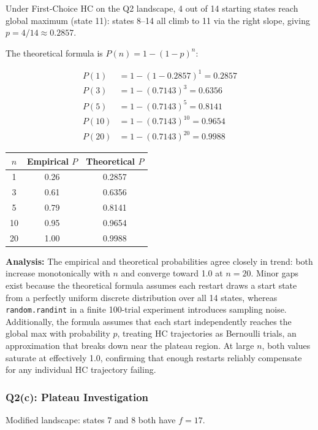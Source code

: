 \documentclass[12pt,a4paper]{article}
\begin{document}
Under First-Choice HC on the Q2 landscape, 4 out of 14 starting states reach
 global maximum (state 11): states 8--14 all climb to 11 via the right slope,
giving $p = 4/14 \approx 0.2857$.

The theoretical formula is $P(n) = 1 - (1-p)^n$:

\begin{align*}
P(1)  &= 1 - (1 - 0.2857)^1  = 0.2857 \\
P(3)  &= 1 - (0.7143)^3      = 0.6356 \\
P(5)  &= 1 - (0.7143)^5      = 0.8141 \\
P(10) &= 1 - (0.7143)^{10}   = 0.9654 \\
P(20) &= 1 - (0.7143)^{20}   = 0.9988
\end{align*}

\begin{center}
\begin{tabular}{ccc}
\toprule
$n$ & Empirical $P$ & Theoretical $P$ \\
\midrule
1  & 0.26 & 0.2857 \\
3  & 0.61 & 0.6356 \\
5  & 0.79 & 0.8141 \\
10 & 0.95 & 0.9654 \\
20 & 1.00 & 0.9988 \\
\bottomrule
\end{tabular}
\end{center}

\textbf{Analysis:}
The empirical and theoretical probabilities agree closely in trend: both increase
monotonically with $n$ and converge toward 1.0 at $n=20$.
Minor gaps exist because the theoretical formula assumes each restart draws a
start state from a perfectly uniform discrete distribution over all 14 states,
whereas \texttt{random.randint} in a finite 100-trial experiment introduces
sampling noise.
Additionally, the formula assumes that each start independently reaches the global max
with probability $p$, treating HC trajectories as Bernoulli trials, an
approximation that breaks down near the plateau region.
At large $n$, both values saturate at effectively 1.0, confirming that enough
restarts reliably compensate for any individual HC trajectory failing.

\subsubsection*{Q2(c): Plateau Investigation}

Modified landscape: states 7 and 8 both have $f=17$.
\end{document}
